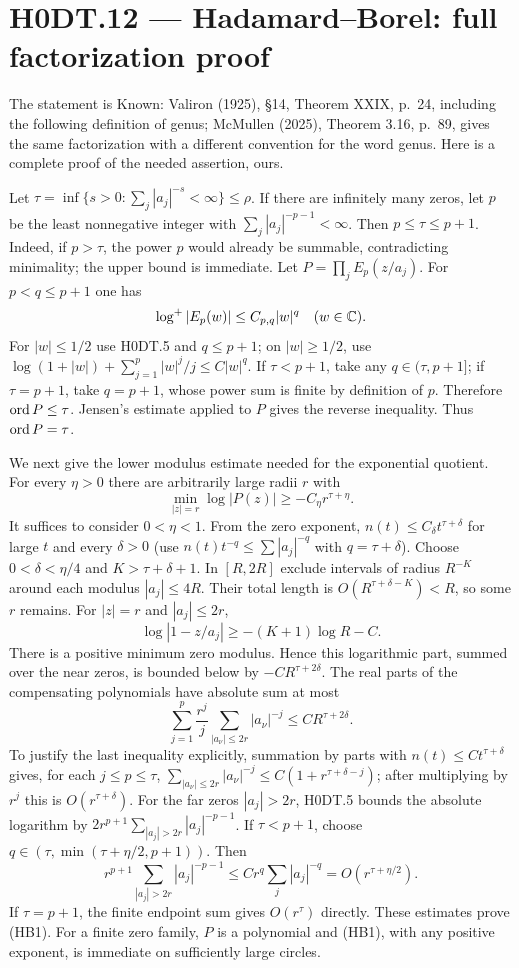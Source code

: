 \section*{H0DT.12 --- Hadamard--Borel: full factorization proof}
The statement is Known: Valiron (1925), \S14, Theorem XXIX, p.~24, including the following definition of genus; McMullen (2025), Theorem 3.16, p.~89, gives the same factorization with a different convention for the word genus. Here is a complete proof of the needed assertion, ours.

Let $\tau=\inf\{s>0:\sum_j|a_j|^{-s}<\infty\}\le\rho$. If there are infinitely many zeros, let $p$ be the least nonnegative integer with $\sum_j|a_j|^{-p-1}<\infty$. Then $p\le\tau\le p+1$. Indeed, if $p>\tau$, the power $p$ would already be summable, contradicting minimality; the upper bound is immediate. Let $P=\prod_jE_p(z/a_j)$. For $p<q\le p+1$ one has
\[
 \log^+|E_p(w)|\le C_{p,q}|w|^q \quad(w\in\mathbb C).
\]
For $|w|\le1/2$ use H0DT.5 and $q\le p+1$; on $|w|\ge1/2$, use $\log(1+|w|)+\sum_{j=1}^p|w|^j/j\le C|w|^q$. If $\tau<p+1$, take any $q\in(\tau,p+1]$; if $\tau=p+1$, take $q=p+1$, whose power sum is finite by definition of $p$. Therefore $\operatorname{ord} P\le\tau$. Jensen's estimate applied to $P$ gives the reverse inequality. Thus $\operatorname{ord} P=\tau$.

We next give the lower modulus estimate needed for the exponential quotient. For every $\eta>0$ there are arbitrarily large radii $r$ with
\[
 \min_{|z|=r}\log|P(z)|\ge-C_\eta r^{\tau+\eta}. \tag{HB1}
\]
It suffices to consider $0<\eta<1$. From the zero exponent, $n(t)\le C_\delta t^{\tau+\delta}$ for large $t$ and every $\delta>0$ (use $n(t)t^{-q}\le\sum |a_j|^{-q}$ with $q=\tau+\delta$). Choose $0<\delta<\eta/4$ and $K>\tau+\delta+1$. In $[R,2R]$ exclude intervals of radius $R^{-K}$ around each modulus $|a_j|\le4R$. Their total length is $O(R^{\tau+\delta-K})<R$, so some $r$ remains. For $|z|=r$ and $|a_j|\le2r$,
\[
 \log|1-z/a_j|\ge-(K+1)\log R-C.
\]
There is a positive minimum zero modulus. Hence this logarithmic part, summed over the near zeros, is bounded below by $-C R^{\tau+2\delta}$. The real parts of the compensating polynomials have absolute sum at most
\[
 \sum_{j=1}^{p}\frac{r^j}{j}\sum_{|a_\nu|\le2r}|a_\nu|^{-j}
 \le C R^{\tau+2\delta}.
\]
To justify the last inequality explicitly, summation by parts with $n(t)\le Ct^{\tau+\delta}$ gives, for each $j\le p\le\tau$,
$\sum_{|a_\nu|\le2r}|a_\nu|^{-j}\le C(1+r^{\tau+\delta-j})$; after multiplying by $r^j$ this is $O(r^{\tau+\delta})$.
For the far zeros $|a_j|>2r$, H0DT.5 bounds the absolute logarithm by $2r^{p+1}\sum_{|a_j|>2r}|a_j|^{-p-1}$. If $\tau<p+1$, choose $q\in(\tau,\min(\tau+\eta/2,p+1))$. Then
\[
 r^{p+1}\sum_{|a_j|>2r}|a_j|^{-p-1}
 \le C r^q\sum_j|a_j|^{-q}=O(r^{\tau+\eta/2}).
\]
If $\tau=p+1$, the finite endpoint sum gives $O(r^\tau)$ directly. These estimates prove (HB1). For a finite zero family, $P$ is a polynomial and (HB1), with any positive exponent, is immediate on sufficiently large circles.

